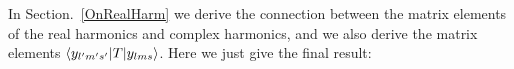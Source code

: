 \documentclass[aps,prb,floatfix,epsfig,singlecolumn,showpacs,preprintnumbers]{revtex4}
\renewcommand{\Im}{\textrm{Im}}
\renewcommand{\Re}{\textrm{Re}}
\begin{document}
In Section.~\ref{OnRealHarm} we derive the connection between the
matrix elements of the real harmonics and complex harmonics, and we
also derive the matrix elements $\braket{y_{l'm's'}|T|y_{lms}}$. Here
we just give the final result:


\end{document}
